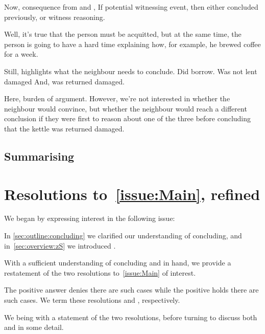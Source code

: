 \begin{note}
  Now, consequence from \ideaCS{} and \ESU{},
  If potential witnessing event, then either concluded previously, or witness reasoning.
\end{note}

\begin{note}
  Well, it's true that the person must be acquitted, but at the same time, the person is going to have a hard time explaining how, for example, he brewed coffee for a week.

  Still, highlights what the neighbour needs to conclude.
  Did borrow.
  Was not lent damaged
  And, was returned damaged.

  Here, burden of argument.
  However, we're not interested in whether the neighbour would convince, but whether the neighbour would reach a different conclusion if they were first to reason about one of the three before concluding that the kettle was returned damaged.
\end{note}

\subsection{Summarising}
\label{sec:overview:CS:summarising}



\section{Resolutions to~\autoref{issue:Main}, refined}
\label{sec:issue-refined}

\begin{note}
  We began by expressing interest in the following issue:
  \vspace{-\baselineskip}
  \begin{quote}
    \issueMain*
  \end{quote}
  In \autoref{sec:outline:concluding} we clarified our understanding of concluding, and in~\autoref{sec:overview:zS} we introduced .

  With a sufficient understanding of concluding and  in hand, we provide a restatement of the two resolutions to~\autoref{issue:Main} of interest.

  The positive answer denies there are such cases while the positive holds there are such cases.
  We term these resolutions \ESU{} and \EAS{}, respectively.

  We being with a statement of the two resolutions, before turning to discuss both \ESU{} and \EAS{} in some detail.
\end{note}

